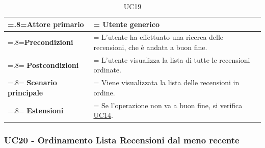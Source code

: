             \begin{table}[H]
                \centering
                \renewcommand{\arraystretch}{1.8}
                \renewcommand\tabularxcolumn[1]{m{#1}}
                \begin{tabularx}{0.9\textwidth} {
                    >{\hsize=.8\hsize\linewidth=\hsize}X
                    >{\hsize=1.2\hsize\linewidth=\hsize}X}
                    \hline
                    \textbf{Attore primario} & Utente generico \\
                    \hline
                    \textbf{Precondizioni} & L'utente ha effettuato una ricerca delle recensioni, che è andata a buon fine. \\
                    \hline
                    \textbf{Postcondizioni} & L'utente visualizza la lista di tutte le recensioni ordinate. \\
                    \hline
                    \textbf{Scenario principale} & Viene visualizzata la lista delle recensioni in ordine. \\
                    \hline
                    \textbf{Estensioni} & Se l'operazione non va a buon fine, si verifica \hyperref[UC14]{UC14}. \\
                    \hline
                \end{tabularx}
                \caption{UC19}
            \end{table}

        \subsubsection{UC20 - Ordinamento Lista Recensioni dal meno recente}
        \label{UC20}

